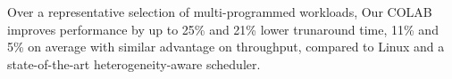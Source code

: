 \documentclass[10pt,conference]{IEEEtran}
\begin{document}
Over a representative selection of multi-programmed workloads, 
Our COLAB improves performance by up to 25\% and 21\% lower trunaround time, 11\% and 5\% on average with similar advantage on throughput, compared to Linux and a state-of-the-art heterogeneity-aware scheduler.







\end{document}
